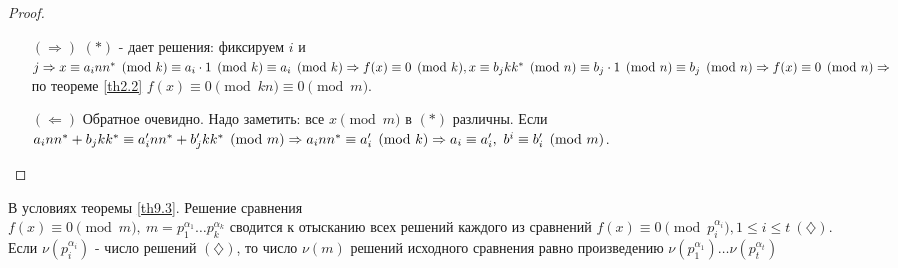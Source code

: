     \begin{proof}\tab
        \begin{itemize}
            \item[$(\Rightarrow)$] $(\ast)$ - дает решения: фиксируем $i$ и $j\\
            \Rightarrow x\equiv a_i n n^* \pmod{k}\equiv a_i\cdot 1\pmod{k}\equiv a_i\pmod{k}\Rightarrow f(x)\equiv 0\pmod{k},\\
            x\equiv b_j k k^*\pmod{n}\equiv b_j\cdot 1\pmod{n}\equiv b_j\pmod{n}\Rightarrow f(x)\equiv0\pmod{n}\\
            \Rightarrow$ по теореме \ref{th2.2} $f(x)\equiv 0\pmod{kn}\equiv 0\pmod{m}$.
            \item[$(\Leftarrow)$] Обратное очевидно. Надо заметить: все $x\pmod{m}$ в $(\ast)$ различны. Если $a_i n n^*+b_j k k^*\equiv a_i^{\prime}nn^*+b_j^{\prime} k k^* \pmod{m} \Rightarrow a_i n n^*\equiv a_i^{\prime} \pmod{k}\\
            \Rightarrow a_i\equiv a_i^{\prime},\ b^i\equiv b_i^{\prime} \pmod{m}$.
        \end{itemize}
    \end{proof} 
    \begin{consequense}
        В условиях теоремы \ref{th9.3}. Решение сравнения\\
        $f(x)\equiv 0\pmod{m},\ m=p_1^{\alpha_1}\dots p_k^{\alpha_k}$ сводится к отысканию всех решений каждого из сравнений $f(x)\equiv 0\pmod{p_i^{\alpha_i}}, 1\leq i\leq t\ (\diamondsuit)$.\\
        Если $\nu(p_i^{\alpha_i})$ - число решений $(\diamondsuit)$, то число $\nu(m)$ решений исходного сравнения равно произведению $\nu(p_1^{\alpha_1})\dots \nu(p_t^{\alpha_t})$
    \end{consequense} 
